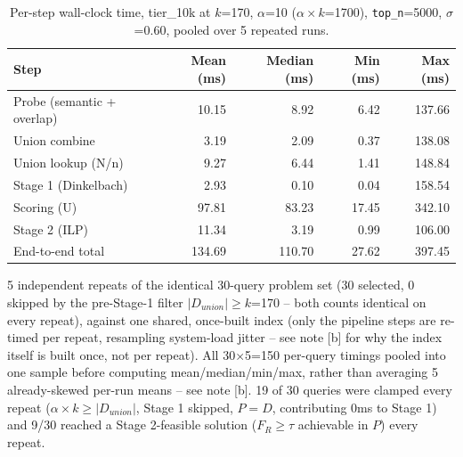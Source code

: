 
\begin{table}[t]
\centering
\begin{threeparttable}
\caption{Per-step wall-clock time, tier\_10k at $k$=170, $\alpha$=10 ($\alpha{\times}k$=1700), \texttt{top\_n}=5000, $\sigma$=0.60, pooled over 5 repeated runs.}
\label{tab:wdc-step-timing-tier_10k}
\begin{tabular}{lrrrr}
\toprule
Step & Mean (ms)\tnote{a} & Median (ms) & Min (ms) & Max (ms) \\
\midrule
Probe (semantic + overlap) & 10.15 & 8.92 & 6.42 & 137.66 \\
Union combine & 3.19 & 2.09 & 0.37 & 138.08 \\
Union lookup (N/n) & 9.27 & 6.44 & 1.41 & 148.84 \\
\midrule
Stage 1 (Dinkelbach)\tnote{b} & 2.93 & 0.10 & 0.04 & 158.54 \\
Scoring (U) & 97.81 & 83.23 & 17.45 & 342.10 \\
Stage 2 (ILP)\tnote{b} & 11.34 & 3.19 & 0.99 & 106.00 \\
End-to-end total & 134.69 & 110.70 & 27.62 & 397.45 \\
\bottomrule
\end{tabular}
\begin{tablenotes}
\footnotesize
\item[a] 5 independent repeats of the identical 30-query problem set (30 selected, 0 skipped by the pre-Stage-1 filter $|D_{union}|\geq k$=170 -- both counts identical on every repeat), against one shared, once-built index (only the pipeline steps are re-timed per repeat, resampling system-load jitter -- see note [b] for why the index itself is built once, not per repeat). All 30$\times$5=150 per-query timings pooled into one sample before computing mean/median/min/max, rather than averaging 5 already-skewed per-run means -- see note [b]. 19 of 30 queries were clamped every repeat ($\alpha{\times}k \geq |D_{union}|$, Stage 1 skipped, $P=D$, contributing 0ms to Stage 1) and 9/30 reached a Stage 2-feasible solution ($F_R \geq \tau$ achievable in $P$) every repeat.

\end{tablenotes}
\end{threeparttable}
\end{table}
